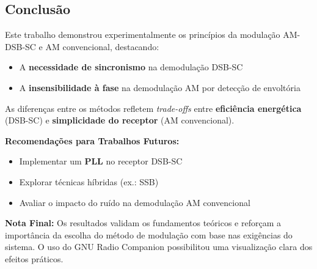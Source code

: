 \subsection{Conclusão}

Este trabalho demonstrou experimentalmente os princípios da modulação AM-DSB-SC e AM convencional, destacando:

\begin{itemize}
    \item A \textbf{necessidade de sincronismo} na demodulação DSB-SC
    \item A \textbf{insensibilidade à fase} na demodulação AM por detecção de envoltória
\end{itemize}

As diferenças entre os métodos refletem \textit{trade-offs} entre \textbf{eficiência energética} (DSB-SC) e \textbf{simplicidade do receptor} (AM convencional).

\textbf{Recomendações para Trabalhos Futuros:}
\begin{itemize}
    \item Implementar um \textbf{PLL} no receptor DSB-SC
    \item Explorar técnicas híbridas (ex.: SSB)
    \item Avaliar o impacto do ruído na demodulação AM convencional
\end{itemize}

\textbf{Nota Final:} Os resultados validam os fundamentos teóricos e reforçam a importância da escolha do método de modulação com base nas exigências do sistema. O uso do GNU Radio Companion possibilitou uma visualização clara dos efeitos práticos.

